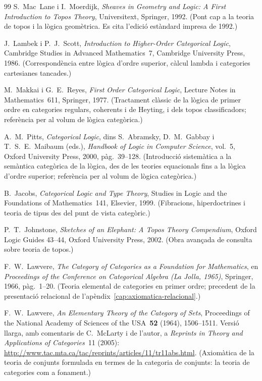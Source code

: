 \begin{thebibliography}{99}
S.~Mac~Lane i I.~Moerdijk,
\emph{Sheaves in Geometry and Logic: A First Introduction to Topos Theory},
Universitext, Springer, 1992.
\newblock (Pont cap a la teoria de topos i la lògica geomètrica. Es cita l'edició estàndard impresa de 1992.)

J.~Lambek i P.~J.~Scott,
\emph{Introduction to Higher-Order Categorical Logic},
Cambridge Studies in Advanced Mathematics~7, Cambridge University Press, 1986.
\newblock (Correspondència entre lògica d'ordre superior, càlcul lambda i categories cartesianes tancades.)

M.~Makkai i G.~E.~Reyes,
\emph{First Order Categorical Logic},
Lecture Notes in Mathematics~611, Springer, 1977.
\newblock (Tractament clàssic de la lògica de primer ordre en categories regulars, coherents i de Heyting, i dels topos classificadors; referència per al volum de lògica categòrica.)

A.~M.~Pitts,
\emph{Categorical Logic},
dins S.~Abramsky, D.~M.~Gabbay i T.~S.~E.~Maibaum (eds.), \emph{Handbook of Logic in Computer Science}, vol.~5, Oxford University Press, 2000, pàg.~39--128.
\newblock (Introducció sistemàtica a la semàntica categòrica de la lògica, des de les teories equacionals fins a la lògica d'ordre superior; referència per al volum de lògica categòrica.)

B.~Jacobs,
\emph{Categorical Logic and Type Theory},
Studies in Logic and the Foundations of Mathematics~141, Elsevier, 1999.
\newblock (Fibracions, hiperdoctrines i teoria de tipus des del punt de vista categòric.)

P.~T.~Johnstone,
\emph{Sketches of an Elephant: A Topos Theory Compendium},
Oxford Logic Guides 43--44, Oxford University Press, 2002.
\newblock (Obra avançada de consulta sobre teoria de topos.)

F.~W.~Lawvere,
\emph{The Category of Categories as a Foundation for Mathematics},
en \emph{Proceedings of the Conference on Categorical Algebra (La Jolla, 1965)}, Springer, 1966, pàg.~1--20.
\newblock (Teoria elemental de categories en primer ordre; precedent de la presentació relacional de l'apèndix~\ref{cap:axiomatica-relacional}.)

F.~W.~Lawvere,
\emph{An Elementary Theory of the Category of Sets},
Proceedings of the National Academy of Sciences of the USA~\textbf{52} (1964), 1506--1511. Versió llarga, amb comentaris de C.~McLarty i de l'autor, a \emph{Reprints in Theory and Applications of Categories}~11 (2005): \url{http://www.tac.mta.ca/tac/reprints/articles/11/tr11abs.html}.
\newblock (Axiomàtica de la teoria de conjunts formulada en termes de la categoria de conjunts: la teoria de categories com a fonament.)


\end{thebibliography}
